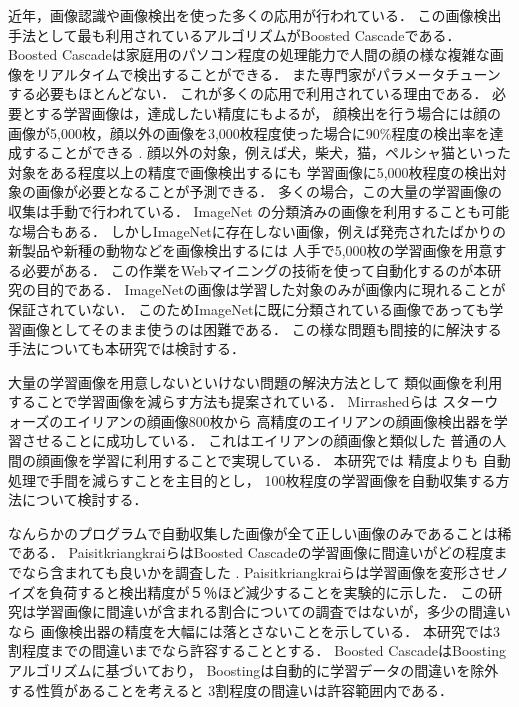 近年，画像認識や画像検出を使った多くの応用が行われている．
この画像検出手法として最も利用されているアルゴリズムがBoosted Cascade\cite{Viola01rapidobject}である．
Boosted Cascadeは家庭用のパソコン程度の処理能力で人間の顔の様な複雑な画像をリアルタイムで検出することができる．
また専門家がパラメータチューンする必要もほとんどない．
これが多くの応用で利用されている理由である．
必要とする学習画像は，達成したい精度にもよるが，
顔検出を行う場合には顔の画像が5,000枚，顔以外の画像を3,000枚程度使った場合に90\%程度の検出率を達成することができる
\cite{Lienhart03empiricalanalysis}
.
顔以外の対象，例えば犬，柴犬，猫，ペルシャ猫といった対象をある程度以上の精度で画像検出するにも
学習画像に5,000枚程度の検出対象の画像が必要となることが予測できる．
多くの場合，この大量の学習画像の収集は手動で行われている．
ImageNet\cite{imagenet}
の分類済みの画像を利用することも可能な場合もある．
しかしImageNetに存在しない画像，例えば発売されたばかりの新製品や新種の動物などを画像検出するには
人手で5,000枚の学習画像を用意する必要がある．
この作業をWebマイニングの技術を使って自動化するのが本研究の目的である．
ImageNetの画像は学習した対象のみが画像内に現れることが保証されていない．
このためImageNetに既に分類されている画像であっても学習画像としてそのまま使うのは困難である．
この様な問題も間接的に解決する手法についても本研究では検討する．

大量の学習画像を用意しないといけない問題の解決方法として
類似画像を利用することで学習画像を減らす方法も提案されている．
Mirrashed\cite{Mirrashed_2013_ICCV}らは
スターウォーズのエイリアンの顔画像800枚から
高精度のエイリアンの顔画像検出器を学習させることに成功している．
これはエイリアンの顔画像と類似した
普通の人間の顔画像を学習に利用することで実現している．
本研究では
精度よりも
自動処理で手間を減らすことを主目的とし，
100枚程度の学習画像を自動収集する方法について検討する．

なんらかのプログラムで自動収集した画像が全て正しい画像のみであることは稀である．
PaisitkriangkraiらはBoosted Cascadeの学習画像に間違いがどの程度までなら含まれても良いかを調査した
\cite{DBLP:journals/corr/abs-1009-5758}
.
Paisitkriangkraiらは学習画像を変形させノイズを負荷すると検出精度が５％ほど減少することを実験的に示した．
この研究は学習画像に間違いが含まれる割合についての調査ではないが，多少の間違いなら
画像検出器の精度を大幅には落とさないことを示している．
本研究では3割程度までの間違いまでなら許容することとする．
Boosted CascadeはBoostingアルゴリズムに基づいており，
Boostingは自動的に学習データの間違いを除外する性質があることを考えると
3割程度の間違いは許容範囲内である．


